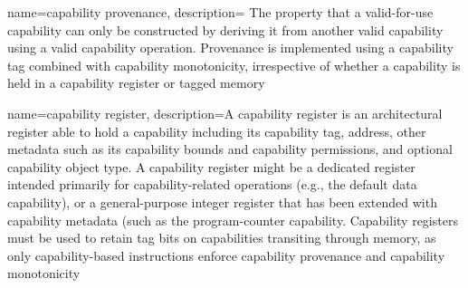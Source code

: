 {
  name=capability provenance,
  description={
The property that a valid-for-use \gls{capability} can only be
    constructed by deriving it from another valid capability
    using a valid capability operation.
    Provenance is implemented using a \gls{capability tag} combined with
    \gls{capability monotonicity}, 
irrespective of 
%
whether a
    capability is held in a \gls{capability register} or \gls{tagged memory}}
}

{
  name=capability register,
  description={A capability register is an architectural register able to hold
    a \gls{capability} including its \gls{capability tag}, \gls{address},
    other  metadata such as
    its \gls{capability bounds} and \gls{capability permissions}, and optional
    \gls{capability object type}.
    A capability register might be a dedicated register intended primarily for
    capability-related operations (e.g., the \gls{default data capability}), or a general-purpose integer
    register that has been extended with capability metadata (such as the
    \gls{program-counter capability}.
    Capability registers must be used to retain tag bits on capabilities
    transiting through memory, as only \gls{capability-based instructions}
    enforce \gls{capability provenance} and \gls{capability monotonicity}}
}

